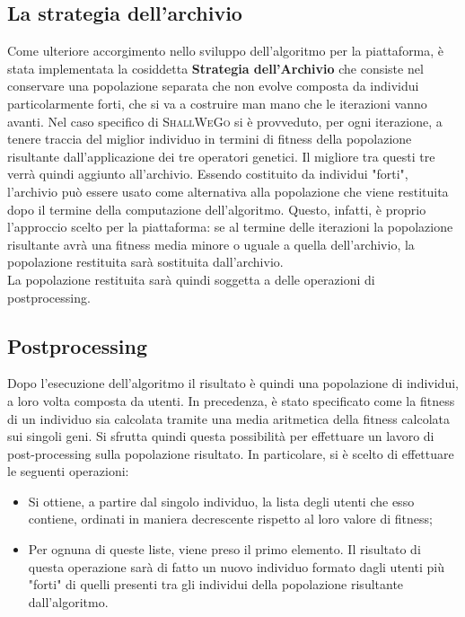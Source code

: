         \subsection{La strategia dell'archivio}
            Come ulteriore accorgimento nello sviluppo dell'algoritmo per la piattaforma, è stata implementata la cosiddetta \textbf{Strategia dell'Archivio} che consiste nel conservare una popolazione separata che non evolve composta da individui particolarmente forti, che si va a costruire man mano che le iterazioni vanno avanti. Nel caso specifico di \textsc{ShallWeGo} si è provveduto, per ogni iterazione, a tenere traccia del miglior individuo in termini di fitness della popolazione risultante dall'applicazione dei tre operatori genetici. Il migliore tra questi tre verrà quindi aggiunto all'archivio.
            Essendo costituito da individui "forti", l'archivio può essere usato come alternativa alla popolazione che viene restituita dopo il termine della computazione dell'algoritmo. Questo, infatti, è proprio l'approccio scelto per la piattaforma: se al termine delle iterazioni la popolazione risultante avrà una fitness media minore o uguale a quella dell'archivio, la popolazione restituita sarà sostituita dall'archivio. \\
            La popolazione restituita sarà quindi soggetta a delle operazioni di postprocessing.

        \subsection{Postprocessing}
            Dopo l'esecuzione dell'algoritmo il risultato è quindi una popolazione di individui, a loro volta composta da utenti. In precedenza, è stato specificato come la fitness di un individuo sia calcolata tramite una media aritmetica della fitness calcolata sui singoli geni. Si sfrutta quindi questa possibilità per effettuare un lavoro di post-processing sulla popolazione risultato. In particolare, si è scelto di effettuare le seguenti operazioni:

            \begin{itemize}
                \item Si ottiene, a partire dal singolo individuo, la lista degli utenti che esso contiene, ordinati in maniera decrescente rispetto al loro valore di fitness;
                \item Per ognuna di queste liste, viene preso il primo elemento. Il risultato di questa operazione sarà di fatto un nuovo individuo formato dagli utenti più "forti" di quelli presenti tra gli individui della popolazione risultante dall'algoritmo.
            \end{itemize}

